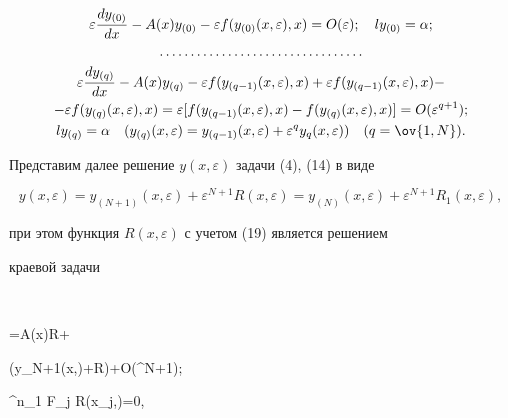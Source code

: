 \begin{gather*} 


\varepsilon\frac{dy_{(0)}}{dx}-A(x)y_{(0)}-\varepsilon 


f(y_{(0)}(x,\varepsilon),x)=O(\varepsilon);\quad 


l y_{(0)}=\alpha;\\ 


\dotsc\dotsc\dotsc\dotsc\dotsc\dotsc\dotsc\dotsc\dotsc\dotsc\dotsc\\ 


\varepsilon\frac{dy_{(q)}}{dx}-A(x)y_{(q)}-\varepsilon 


f(y_{(q-1)}(x,\varepsilon),x)+\varepsilon 


f(y_{(q-1)}(x,\varepsilon),x) -\\ 


-\varepsilon f(y_{(q)}(x,\varepsilon),x)=\varepsilon 


[f(y_{(q-1)}(x,\varepsilon),x)- 


f(y_{(q)}(x,\varepsilon),x)]=O(\varepsilon^{q+1});\\ 


l y_{(q)}=\alpha\quad (y_{(q)}(x,\varepsilon)= 


y_{(q-1)}(x,\varepsilon)+\varepsilon^q 


y_q(x,\varepsilon))\quad (q=\ov{1,N}). 


\end{gather*} 


 


Представим далее решение $y(x,\varepsilon)$ задачи (4), (14) в виде 


$$ 


y(x,\varepsilon)=y_{(N+1)}(x,\varepsilon)+ 


\varepsilon^{N+1}R(x,\varepsilon)=y_{(N)}(x,\varepsilon)+ 


\varepsilon^{N+1}R_1(x,\varepsilon), 


$$ 


при этом функция $R(x,\varepsilon)$ с учетом (19) является решением 


краевой задачи 


$$ 


\varepsilon{}=A(x)R+\varepsilon 




(y_{N+1}(x,\varepsilon)+R)+O(\varepsilon^{N+1});\quad 


\sum^n_1 F_j R(x_j,\varepsilon)=0, 


